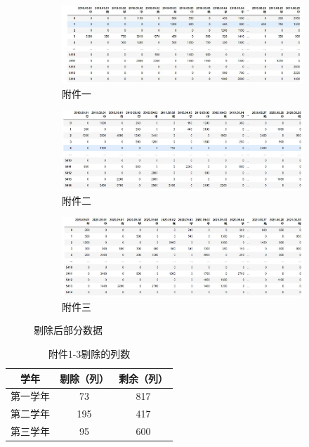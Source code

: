 \documentclass{article}
\begin{document}
\begin{figure}[htbp]
  \centering
  \begin{subfigure}[b]{0.3\textwidth}
    \centering
    \includegraphics[width=\textwidth]{attachment1_disredundented.jpg}
    \caption{附件一}
    \label{attachment1}
  \end{subfigure}
  \hfill
  \begin{subfigure}[b]{0.3\textwidth}
    \centering
    \includegraphics[width=\textwidth]{attachment2_disredundented.jpg}
    \caption{附件二}
    \label{attachment2}
  \end{subfigure}
  \hfill
  \begin{subfigure}[b]{0.3\textwidth}
    \centering
    \includegraphics[width=\textwidth]{attachment3_disredundented.jpg}
    \caption{附件三}
    \label{attachment33}
  \end{subfigure}
  \caption{剔除后部分数据}
  \label{attachment1-3}
\end{figure}

\begin{table}[htbp]
  \centering
  \caption{附件1-3剔除的列数}
  \begin{tabular}{ccc}
    \toprule
    学年 & 剔除（列） & 剩余（列） \\
    \midrule
    第一学年 & 73 & 817 \\
    第二学年 & 195 & 417 \\
    第三学年 & 95 & 600 \\
    \bottomrule
  \end{tabular}
\end{table}
\end{document}
